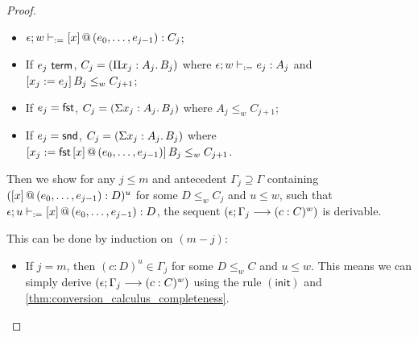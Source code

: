 \documentclass[twoside]{report}
\begin{document}
\begin{proof}
\begin{itemize}
              \begin{itemize}
                  \item $\epsilon; w \vdash_{:=} {[x]}\,@\,({e_0, \ldots, e_{j-1}}) : C_j$;
                  \item If $e_j \ \mathsf{term}$, $C_j = (\Pi{x_j} : {A_j}.\,{B_j})$ where $\epsilon; w \vdash_{:=} e_j : A_j$ and $[{x_j}:={e_j}]\,{B_j} \leq_w C_{j+1}$;
                  \item If $e_j = \operatorname{\mathsf{fst}}$, $C_j = (\Sigma{x_j} : {A_j}.\,{B_j})$ where $A_j \leq_w C_{j+1}$;
                  \item If $e_j = \operatorname{\mathsf{snd}}$, $C_j = (\Sigma{x_j} : {A_j}.\,{B_j})$ where $[{x_j}:={\operatorname{\mathsf{fst}} {[x]}\,@\,({e_0, \ldots, e_{j-1}})}]\,{B}_j \leq_w C_{j+1}$.
              \end{itemize}

              Then we show for any $j \leq m$ and antecedent $\Gamma_j \supseteq \Gamma$ containing $({[x]}\,@\,({e_0, \ldots, e_{j-1}}) : D)^u$ for some $D \leq_w C_j$ and $u \leq w$, such that $\epsilon; u \vdash_{:=} {[x]}\,@\,({e_0, \ldots, e_{j-1}}) : D$, the sequent $(\epsilon; \Gamma_j \longrightarrow (c : C)^w)$ is derivable.

              This can be done by induction on $(m - j)$:

              \begin{itemize}
                  \item If $j = m$, then $(c : D)^u \in \Gamma_j$ for some $D \leq_w C$ and $u \leq w$. This means we can simply derive $(\epsilon; \Gamma_j \longrightarrow (c : C)^w)$ using the rule $(\mathsf{init})$ and \cref{thm:conversion_calculus_completeness}.


\end{itemize}
\end{itemize}
\end{proof}
\end{document}
